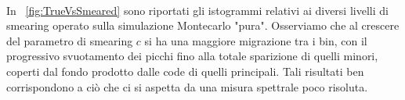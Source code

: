 \begin{figure}
	 \\
	\label{fig:SmearingMatrix}
\end{figure}

\newpage

\noindent In \figurename~\ref{fig:TrueVsSmeared} sono riportati gli istogrammi relativi ai diversi livelli di smearing operato sulla simulazione Montecarlo "pura". Osserviamo che al crescere del parametro di smearing $c$ si ha una maggiore migrazione tra i bin, con il progressivo svuotamento dei picchi fino alla totale sparizione di quelli minori, coperti dal fondo prodotto dalle code di quelli principali. Tali risultati ben corrispondono a ciò che ci si aspetta da una misura spettrale poco risoluta.\\

